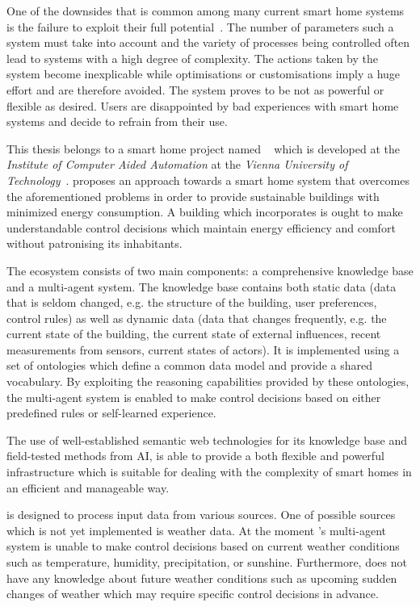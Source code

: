 One of the downsides that is common among many current smart home systems is the failure to exploit their full potential~\cite{HomeAutomationChallengesOpportunities,HomeMaestro,StateOfHomeNetworking}. The number of parameters such a system must take into account and the variety of processes being controlled often lead to systems with a high degree of complexity. The actions taken by the system become inexplicable while optimisations or customisations imply a huge effort and are therefore avoided. The system proves to be not as powerful or flexible as desired. Users are disappointed by bad experiences with smart home systems and decide to refrain from their use.

This thesis belongs to a smart home project named \thinkhome~\cite{ThinkHomeWeb} which is developed at the \emph{Institute of Computer Aided Automation} at the \emph{Vienna University of Technology}~\cite{CR2011-TH_Journal,CR2010-DEST_ThinkHome}. \thinkhome proposes an approach towards a smart home system that overcomes the aforementioned problems in order to provide sustainable buildings with minimized energy consumption. A building which incorporates \thinkhome is ought to make understandable control decisions which maintain energy efficiency and comfort without patronising its inhabitants.

The \thinkhome ecosystem consists of two main components: a comprehensive knowledge base and a multi-agent system. The knowledge base contains both static data (data that is seldom changed, e.g. the structure of the building, user preferences, control rules) as well as dynamic data (data that changes frequently, e.g. the current state of the building, the current state of external influences, recent measurements from sensors, current states of actors). It is implemented using a set of ontologies which define a common data model and provide a shared vocabulary. By exploiting the reasoning capabilities provided by these ontologies, the multi-agent system is enabled to make control decisions based on either predefined rules or self-learned experience.

The use of well-established semantic web technologies for its knowledge base and field-tested methods from AI, \thinkhome is able to provide a both flexible and powerful infrastructure which is suitable for dealing with the complexity of smart homes in an efficient and manageable way.

\thinkhome is designed to process input data from various sources. One of possible sources which is not yet implemented is weather data. At the moment \thinkhome's multi-agent system is unable to make control decisions based on current weather conditions such as temperature, humidity, precipitation, or sunshine. Furthermore, \thinkhome does not have any knowledge about future weather conditions such as upcoming sudden changes of weather which may require specific control decisions in advance.

